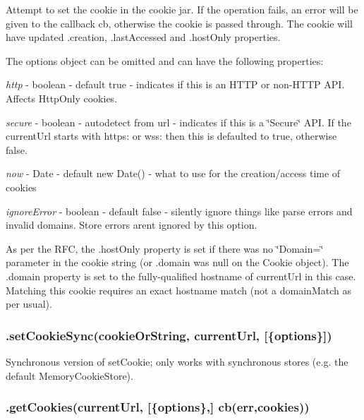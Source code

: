 Attempt to set the cookie in the cookie jar. If the operation fails, an error will be given to the callback {\ttfamily cb}, otherwise the cookie is passed through. The cookie will have updated {\ttfamily .creation}, {\ttfamily .last\+Accessed} and {\ttfamily .host\+Only} properties.

The {\ttfamily options} object can be omitted and can have the following properties\+:


\begin{DoxyItemize}
\item {\itshape http} -\/ boolean -\/ default {\ttfamily true} -\/ indicates if this is an H\+T\+TP or non-\/\+H\+T\+TP A\+PI. Affects Http\+Only cookies.
\item {\itshape secure} -\/ boolean -\/ autodetect from url -\/ indicates if this is a \char`\"{}\+Secure\char`\"{} A\+PI. If the current\+Url starts with {\ttfamily https\+:} or {\ttfamily wss\+:} then this is defaulted to {\ttfamily true}, otherwise {\ttfamily false}.
\item {\itshape now} -\/ Date -\/ default {\ttfamily new Date()} -\/ what to use for the creation/access time of cookies
\item {\itshape ignore\+Error} -\/ boolean -\/ default {\ttfamily false} -\/ silently ignore things like parse errors and invalid domains. {\ttfamily Store} errors aren\textquotesingle{}t ignored by this option.
\end{DoxyItemize}

As per the R\+FC, the {\ttfamily .host\+Only} property is set if there was no \char`\"{}\+Domain=\char`\"{} parameter in the cookie string (or {\ttfamily .domain} was null on the Cookie object). The {\ttfamily .domain} property is set to the fully-\/qualified hostname of {\ttfamily current\+Url} in this case. Matching this cookie requires an exact hostname match (not a {\ttfamily domain\+Match} as per usual).

\subsubsection*{{\ttfamily .set\+Cookie\+Sync(cookie\+Or\+String, current\+Url, \mbox{[}\{options\}\mbox{]})}}

Synchronous version of {\ttfamily set\+Cookie}; only works with synchronous stores (e.\+g. the default {\ttfamily Memory\+Cookie\+Store}).

\subsubsection*{{\ttfamily .get\+Cookies(current\+Url, \mbox{[}\{options\},\mbox{]} cb(err,cookies))}}

